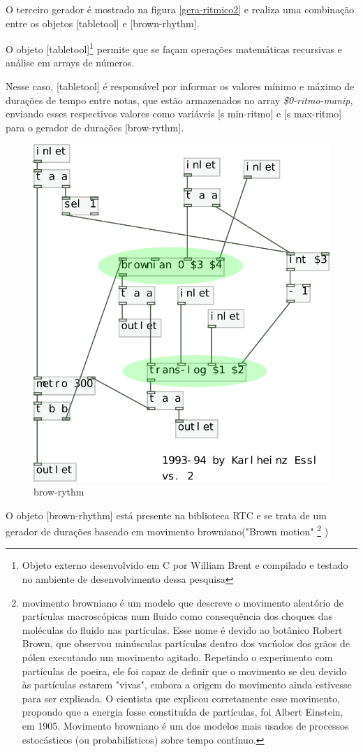 \documentclass[draft]{ppgmus}
\begin{document}
O terceiro gerador é mostrado na figura \ref{gera-ritmico2} e
realiza uma combinação entre os objetos [tabletool] e [brown-rhythm].

O objeto [tabletool]\footnote{Objeto externo desenvolvido em C
por William Brent e compilado e testado no ambiente de desenvolvimento
dessa pesquisa} permite que se façam operações matemáticas
recursivas e análise em arrays de números. 

Nesse caso, [tabletool] é responsável por informar os valores
mínimo e máximo de durações de tempo entre notas, que estão
armazenados no array \textit{\$0-ritmo-manip}, enviando
esses respectivos valores como variáveis [s min-ritmo] e 
[s max-ritmo] para o gerador de durações [brow-rythm].


 \begin{figure}
\includegraphics[scale=.6]{brown-rythm}
\caption{brow-rythm}
\label{brown-rythm}
\end{figure}  

O objeto [brown-rhythm] está presente na biblioteca RTC e se trata de
um gerador de durações baseado em movimento browniano("Brown motion"
\footnote{movimento browniano é um modelo que descreve o movimento aleatório 
de partículas macroscópicas num fluido como consequência dos choques das 
moléculas do fluido nas partículas. Esse nome é devido ao botânico Robert
Brown, que observou minúsculas partículas dentro dos vacúolos dos grãos de 
pólen executando um movimento agitado. Repetindo o experimento com partículas de poeira, 
ele foi capaz de definir que o movimento se deu devido às partículas estarem "vivas", 
embora a origem do movimento ainda estivesse para ser explicada.
O cientista que explicou corretamente esse movimento, propondo que a energia fosse 
constituída de partículas, foi Albert Einstein, em 1905.
Movimento browniano é um dos modelos mais usados de processos estocásticos
(ou probabilísticos) sobre tempo contínuo.} )
\end{document}
